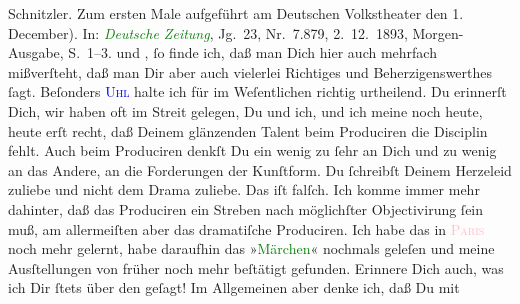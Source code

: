 {{{{{{                           Schnitzler. Zum ersten Male aufgeführt am Deutschen Volkstheater den 1.
                           December)}}. In: \emph{\textcolor{green}{Deutsche
                        Zeitung}}, Jg. 23, Nr. 7.879, 2. 12. 1893,
                        Morgen-Ausgabe, S. 1–3.}}}\label{K_L02721-55h}} und \label{K_L02721-66v}\label{K_L02721-66h}, ſo finde
               ich, daß man Dich hier auch mehrfach mißverſteht, daß man Dir aber auch vielerlei
               Richtiges und Beherzigenswerthes ſagt. Beſonders \textsc{\textcolor{green}{\textcolor{blue}{Uhl}{}\ledrightnote{\textcolor{blue}{Friedrich Uhl}}}{}} halte ich für im Weſentlichen richtig urtheilend. Du erinnerſt Dich, wir haben
               oft im Streit gelegen, Du und ich, und ich meine noch heute, heute erſt recht, daß
               Deinem glänzenden Talent beim Produciren die Disciplin fehlt. Auch beim Produciren
               denkſt Du ein wenig zu ſehr an Dich und zu wenig an das Andere, an die Forderungen
               der Kunſtform. Du ſchreibſt Deinem Herzeleid zuliebe und nicht {\pb}dem Drama zuliebe. Das iſt falſch. Ich komme immer
               mehr dahinter, daß das Produciren ein Streben nach möglichſter Objectivirung ſein
               muß, am allermeiſten aber das dramatiſche Produciren. Ich habe das in \textsc{\textcolor{pink}{Paris}{}\ledrightnote{\textcolor{pink}{Paris}}} noch mehr gelernt, habe daraufhin das »\textcolor{green}{Märchen}{}\ledrightnote{\textcolor{green}{Das Märchen. Schauspiel in drei Aufzügen}}« nochmals geleſen und meine Ausſtellungen von früher noch mehr
               beſtätigt gefunden. Erinnere Dich auch, was ich Dir ſtets über den \label{K_L02721-98v}\label{K_L02721-98h} geſagt! Im Allgemeinen aber denke ich, daß Du mit

